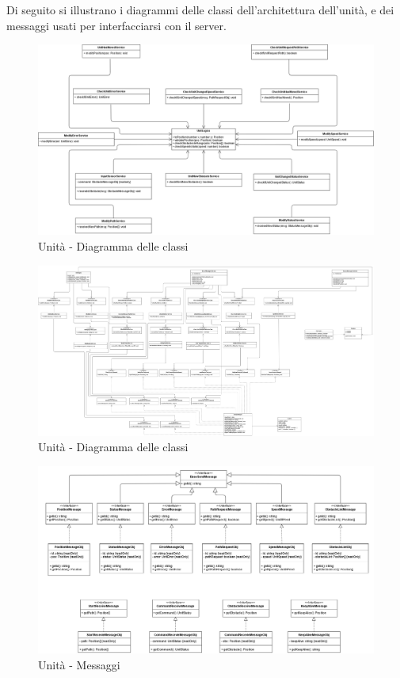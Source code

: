 Di seguito si illustrano i diagrammi delle classi dell'architettura dell'unità, e dei messaggi usati per interfacciarsi con il server.

\begin{landscape}
	\begin{figure}[h!]
		\includegraphics[width=25.5cm]{img/unit_architettura1.png}
		\caption{Unità - Diagramma delle classi}
	\end{figure}
\end{landscape}

\begin{landscape}
	\begin{figure}[h!]
		\includegraphics[width=25.5cm]{img/unit_architettura2.png}
		\caption{Unità - Diagramma delle classi}
	\end{figure}
\end{landscape}


\begin{landscape}
    \begin{figure}[H]
    	\centering
    	\includegraphics[width=25.5cm]{img/unit_messaggi.png}
    	\caption{Unità - Messaggi}
    \end{figure}
\end{landscape}